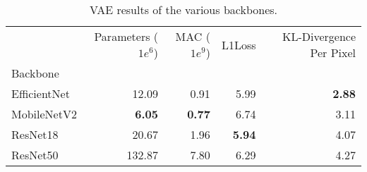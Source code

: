 \begin{table}[ht]
\centering
\caption{VAE results of the various backbones.}
\label{tab:vae-backbones-results}
\begin{tabular}{lrrrr}
\toprule
 & Parameters ($1e^6$) & MAC ($1e^9$) & L1Loss & KL-Divergence Per Pixel \\
Backbone &  &  &  &  \\
\midrule
EfficientNet & 12.09 & 0.91 & 5.99 & \textbf{2.88} \\
MobileNetV2 & \textbf{6.05} & \textbf{0.77} & 6.74 & 3.11 \\
ResNet18 & 20.67 & 1.96 & \textbf{5.94} & 4.07 \\
ResNet50 & 132.87 & 7.80 & 6.29 & 4.27 \\
\bottomrule
\end{tabular}
\end{table}
